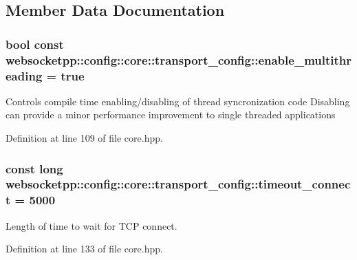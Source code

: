 \subsection{Member Data Documentation}
\hypertarget{structwebsocketpp_1_1config_1_1core_1_1transport__config_aec8759f2af401067ca30c3c36ec36346}{}
\subsubsection[{enable\+\_\+multithreading}]{\setlength{\rightskip}{0pt plus 5cm}bool const websocketpp\+::config\+::core\+::transport\+\_\+config\+::enable\+\_\+multithreading = true\hspace{0.3cm}{\ttfamily [static]}}\label{structwebsocketpp_1_1config_1_1core_1_1transport__config_aec8759f2af401067ca30c3c36ec36346}
Controls compile time enabling/disabling of thread syncronization code Disabling can provide a minor performance improvement to single threaded applications 

Definition at line 109 of file core.\+hpp.

\hypertarget{structwebsocketpp_1_1config_1_1core_1_1transport__config_a7f1a37fc314fd8a5f649bef00ab77987}{}
\subsubsection[{timeout\+\_\+connect}]{\setlength{\rightskip}{0pt plus 5cm}const long websocketpp\+::config\+::core\+::transport\+\_\+config\+::timeout\+\_\+connect = 5000\hspace{0.3cm}{\ttfamily [static]}}\label{structwebsocketpp_1_1config_1_1core_1_1transport__config_a7f1a37fc314fd8a5f649bef00ab77987}


Length of time to wait for T\+C\+P connect. 



Definition at line 133 of file core.\+hpp.

